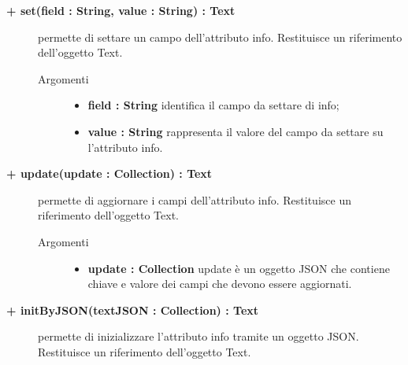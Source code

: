 \begin{description}
\begin{description}
\end{description}


		\begin{description}
		\item[\textbf{\color{blue}+ set(field : String, value : String) : Text			}] \hfill
			permette di settare un campo dell'attributo info. Restituisce un riferimento dell'oggetto Text.
			
		\begin{description}
			\item[Argomenti] \hfill
				\begin{itemize}
				
					\item \textbf{field : String			} \hfill
					identifica il campo da settare di info;
					\item \textbf{value : String			} \hfill
					rappresenta il valore del campo da settare su l'attributo info.
				\end{itemize}
		\end{description}

\end{description}

\begin{description}
		\item[\textbf{\color{blue}+ update(update : Collection) : Text			}] \hfill
			permette di aggiornare i campi dell'attributo info. Restituisce un riferimento dell'oggetto Text.
			
		\begin{description}
			\item[Argomenti] \hfill
				\begin{itemize}
				
					\item \textbf{update : Collection			} \hfill
					update è un oggetto JSON che contiene chiave e valore dei campi che devono essere aggiornati. 
				\end{itemize}
		\end{description}

\end{description}

\begin{description}
		\item[\textbf{\color{blue}+ initByJSON(textJSON : Collection) : Text			}] \hfill
			permette di inizializzare l'attributo info tramite un oggetto JSON. Restituisce un riferimento dell'oggetto Text. 
			

\end{description}
\end{description}
